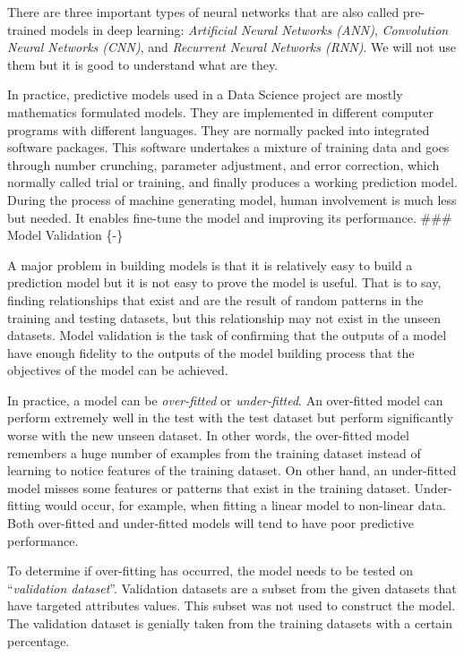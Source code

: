 \documentclass[
]{book}
\begin{document}
There are three important types of neural networks that are also called pre-trained models in deep learning: \emph{Artificial Neural Networks (ANN)}, \emph{Convolution Neural Networks (CNN)}, and \emph{Recurrent Neural Networks (RNN)}. We will not use them but it is good to understand what are they.

In practice, predictive models used in a Data Science project are mostly mathematics formulated models. They are implemented in different computer programs with different languages. They are normally packed into integrated software packages. This software undertakes a mixture of training data and goes through number crunching, parameter adjustment, and error correction, which normally called trial or training, and finally produces a working prediction model. During the process of machine generating model, human involvement is much less but needed. It enables fine-tune the model and improving its performance.
\#\#\# Model Validation \{-\}

A major problem in building models is that it is relatively easy to build a prediction model but it is not easy to prove the model is useful. That is to say, finding relationships that exist and are the result of random patterns in the training and testing datasets, but this relationship may not exist in the unseen datasets. Model validation is the task of confirming that the outputs of a model have enough fidelity to the outputs of the model building process that the objectives of the model can be achieved.

In practice, a model can be \emph{over-fitted} or \emph{under-fitted}. An over-fitted model can perform extremely well in the test with the test dataset but perform significantly worse with the new unseen dataset. In other words, the over-fitted model remembers a huge number of examples from the training dataset instead of learning to notice features of the training dataset. On other hand, an under-fitted model misses some features or patterns that exist in the training dataset. Under-fitting would occur, for example, when fitting a linear model to non-linear data. Both over-fitted and under-fitted models will tend to have poor predictive performance.

To determine if over-fitting has occurred, the model needs to be tested on ``\emph{validation dataset}''. Validation datasets are a subset from the given datasets that have targeted attributes values. This subset was not used to construct the model. The validation dataset is genially taken from the training datasets with a certain percentage.
\end{document}
